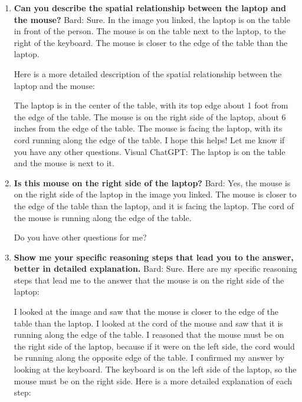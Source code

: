     \begin{enumerate}
        \item \textbf{Can you describe the spatial relationship between the laptop and the mouse?}
        \subitem Bard:
        Sure. In the image you linked, the laptop is on the table in front of the person. The mouse is on the table next to the laptop, to the right of the keyboard. The mouse is closer to the edge of the table than the laptop.
        
        Here is a more detailed description of the spatial relationship between the laptop and the mouse:
        
        The laptop is in the center of the table, with its top edge about 1 foot from the edge of the table.
        The mouse is on the right side of the laptop, about 6 inches from the edge of the table.
        The mouse is facing the laptop, with its cord running along the edge of the table.
        I hope this helps! Let me know if you have any other questions.
        \subitem Visual ChatGPT: The laptop is on the table and the mouse is next to it.
        \item \textbf{Is this mouse on the right side of the laptop?}
        \subitem Bard: 
        Yes, the mouse is on the right side of the laptop in the image you linked. The mouse is closer to the edge of the table than the laptop, and it is facing the laptop. The cord of the mouse is running along the edge of the table.

        Do you have other questions for me?
        \item \textbf{Show me your specific reasoning steps that lead you to the answer, better in detailed explanation.}
        \subitem Bard:
        Sure. Here are my specific reasoning steps that lead me to the answer that the mouse is on the right side of the laptop:

        I looked at the image and saw that the mouse is closer to the edge of the table than the laptop.
        I looked at the cord of the mouse and saw that it is running along the edge of the table.
        I reasoned that the mouse must be on the right side of the laptop, because if it were on the left side, the cord would be running along the opposite edge of the table.
        I confirmed my answer by looking at the keyboard. The keyboard is on the left side of the laptop, so the mouse must be on the right side.
        Here is a more detailed explanation of each step:


\end{enumerate}

